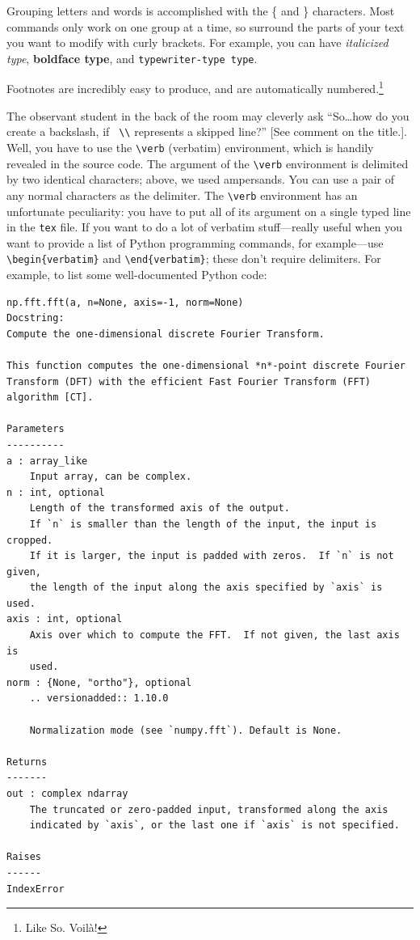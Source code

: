 \documentclass[12pt,preprint]{aastex}
\begin{document}
        Grouping letters and words is accomplished with the \{ and \}
characters.  Most commands only work on one group at a time, so surround
the parts of your text you want to modify with curly brackets. For
example, you can have {\it italicized type}, {\bf boldface type}, and
{\tt typewriter-type type}. 

        Footnotes are incredibly easy to produce, and are automatically
numbered.\footnote{Like So.  Voil\`{a}!}

The observant student in the back of the room may cleverly ask
``So\ldots how do you create a backslash, if \verb& \\& represents a
skipped line?'' [See comment on the title.].  Well, you have to use the
\verb&\verb& (verbatim) environment, which is handily revealed in the
source code.  The argument of the \verb$\verb$ environment is delimited
by two identical characters; above, we used ampersands. You can use a
pair of any normal characters as the delimiter. The \verb$\verb$
environment has an unfortunate peculiarity: you have to put all of its
argument on a single typed line in the \verb$tex$ file. If you want to
do a lot of verbatim stuff---really useful when you want to provide a
list of Python programming commands, for example---use
\verb$\begin{verbatim}$ and \verb$\end{verbatim}$; these don't require
delimiters. For example, to list some well-documented Python code:

\begin{verbatim}
np.fft.fft(a, n=None, axis=-1, norm=None)
Docstring:
Compute the one-dimensional discrete Fourier Transform.

This function computes the one-dimensional *n*-point discrete Fourier
Transform (DFT) with the efficient Fast Fourier Transform (FFT)
algorithm [CT].

Parameters
----------
a : array_like
    Input array, can be complex.
n : int, optional
    Length of the transformed axis of the output.
    If `n` is smaller than the length of the input, the input is cropped.
    If it is larger, the input is padded with zeros.  If `n` is not given,
    the length of the input along the axis specified by `axis` is used.
axis : int, optional
    Axis over which to compute the FFT.  If not given, the last axis is
    used.
norm : {None, "ortho"}, optional
    .. versionadded:: 1.10.0

    Normalization mode (see `numpy.fft`). Default is None.

Returns
-------
out : complex ndarray
    The truncated or zero-padded input, transformed along the axis
    indicated by `axis`, or the last one if `axis` is not specified.

Raises
------
IndexError
\end{verbatim}
\end{document}
